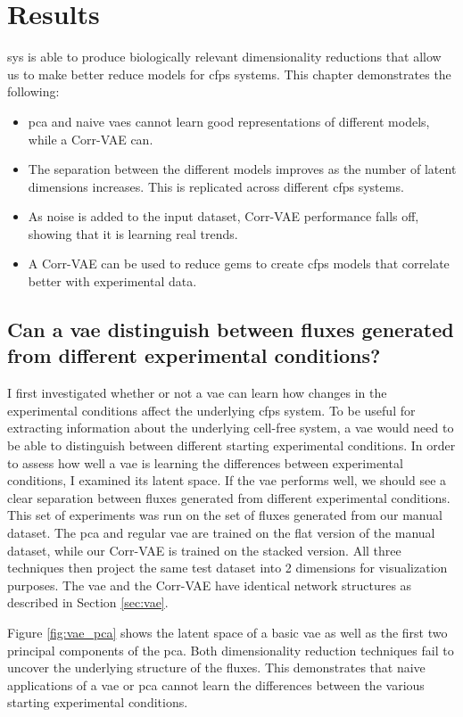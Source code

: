\chapter{Results}\label{chap:res}
\gls{sys} is able to produce biologically relevant dimensionality reductions that allow us to make better reduce models for \gls{cfps} systems.
This chapter demonstrates the following:
\begin{itemize}
\item \gls{pca} and naive \glspl{vae} cannot learn good representations of different models, while a Corr-VAE can.
\item The separation between the different models improves as the number of latent dimensions increases.
This is replicated across different \gls{cfps} systems.
\item As noise is added to the input dataset, Corr-VAE performance falls off, showing that it is learning real trends.
\item A Corr-VAE can be used to reduce \glspl{gem} to create \gls{cfps} models that correlate better with experimental data.
\end{itemize}

\section{Can a \gls{vae} distinguish between fluxes generated from different experimental conditions?}
I first investigated whether or not a \gls{vae} can learn how changes in the experimental conditions affect the underlying \gls{cfps} system.
To be useful for extracting information about the underlying cell-free system, a \gls{vae} would need to be able to distinguish between different starting experimental conditions.
In order to assess how well a \gls{vae} is learning the differences between experimental conditions, I examined its latent space.
If the \gls{vae} performs well, we should see a clear separation between fluxes generated from different experimental conditions.
This set of experiments was run on the set of fluxes generated from our manual dataset.
The \gls{pca} and regular \gls{vae} are trained on the flat version of the manual dataset, while our Corr-VAE is trained on the stacked version.
All three techniques then project the same test dataset into 2 dimensions for visualization purposes.
The \gls{vae} and the Corr-VAE have identical network structures as described in Section \ref{sec:vae}.

Figure \ref{fig:vae_pca} shows the latent space of a basic \gls{vae} as well as the first two principal components of the \gls{pca}.
Both dimensionality reduction techniques fail to uncover the underlying structure of the fluxes.
This demonstrates that naive applications of a \gls{vae} or \gls{pca} cannot learn the differences between the various starting experimental conditions.

